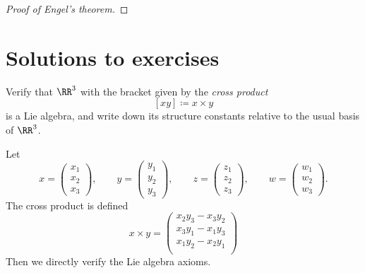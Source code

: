 \documentclass{article}
\begin{document}
\begin{proof}[Proof of Engel's theorem]

\end{proof}

\section{Solutions to exercises}

\begin{exercise}[Humphreys 1.1]
    Verify that $\RR^3$ with the bracket given by the \textit{cross product}
    \[
        [xy]
        \coloneq
        x \times y
    \]
    is a Lie algebra, and write down its structure constants relative to the usual basis of $\RR^3$.
\end{exercise}

Let 
\[
    x
    =
    \begin{pmatrix}
        x_1 \\ x_2 \\ x_3
    \end{pmatrix}, \qquad
    y
    =
    \begin{pmatrix}
        y_1 \\ y_2 \\ y_3
    \end{pmatrix}, \qquad
    z
    =
    \begin{pmatrix}
        z_1 \\ z_2 \\ z_3
    \end{pmatrix}, \qquad
    w
    =
    \begin{pmatrix}
        w_1 \\ w_2 \\ w_3
    \end{pmatrix}.
\]
The cross product is defined
\[
    x \times y
    =
    \begin{pmatrix}
        x_2y_3 - x_3y_2 \\
        x_3y_1 - x_1y_3 \\
        x_1y_2 - x_2y_1 \\
    \end{pmatrix}
\]
Then we directly verify the Lie algebra axioms.
\end{document}
